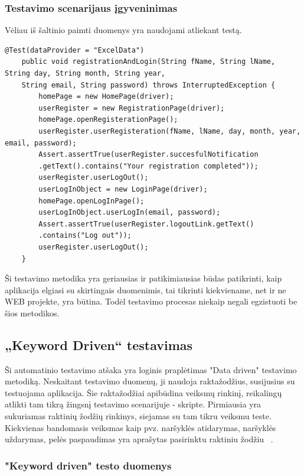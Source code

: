\documentclass[a4paper,12pt,fleqn]{article}
\begin{document}
\subsubsection{Testavimo scenarijaus įgyveninimas}
Vėliau iš šaltinio paimti duomenys yra naudojami atliekant testą.
\begin{lstlisting}[caption={Testo vykdymas ir parametrizacijos procesas naudojant duomenis iš Excel failo.}]
    @Test(dataProvider = "ExcelData")
    public void registrationAndLogin(String fName, String lName, String day, String month, String year, 
    String email, String password) throws InterruptedException {
        homePage = new HomePage(driver);
        userRegister = new RegistrationPage(driver);
        homePage.openRegisterationPage();
        userRegister.userRegisteration(fName, lName, day, month, year, email, password);
        Assert.assertTrue(userRegister.succesfulNotification
        .getText().contains("Your registration completed"));
        userRegister.userLogOut();
        userLogInObject = new LoginPage(driver);
        homePage.openLogInPage();
        userLogInObject.userLogIn(email, password);
        Assert.assertTrue(userRegister.logoutLink.getText()
        .contains("Log out"));
        userRegister.userLogOut();
    }
\end{lstlisting}
Ši testavimo metodika yra geriausias ir patikimiausias būdas patikrinti, kaip aplikacija elgiasi su skirtingais duomenimis, tai tikrinti kiekviename, net ir ne WEB projekte, yra būtina. Todėl testavimo procesas niekaip negali egzistuoti be šios metodikos.

\subsection{„Keyword Driven“ testavimas}
Ši automatinio testavimo atšaka yra loginis praplėtimas "Data driven" testavimo metodiką. Neskaitant testavimo duomenų, ji naudoja raktažodžius, susijusius su testuojama aplikacija. Šie raktažodžiai apibūdina veiksmų rinkinį, reikalingų atlikti tam tikrą žingsnį testavimo scenarijuje - skripte. Pirmiausia yra sukuriamas raktinių žodžių rinkinys, siejamas su tam tikru veiksmu teste. Kiekvienas bandomasis veiksmas kaip pvz. naršyklės atidarymas, naršyklės uždarymas, pelės paspaudimas yra aprašytas pasirinktu raktiniu žodžiu ~\cite{KeywordDrivenTesting}.

\subsubsection{"Keyword driven" testo duomenys}
\end{document}
